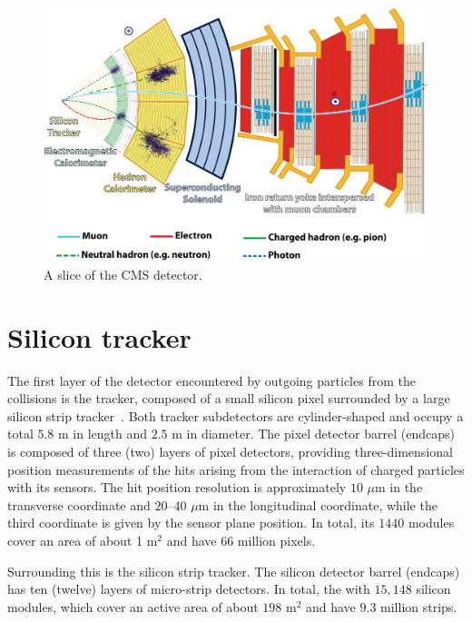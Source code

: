 \begin{figure}\centering
\includegraphics[width=.9\textwidth]{figs/cms/CMSslice_whiteBackground.png}
\caption{A slice of the CMS detector.\label{fig:CMSslice}}
\end{figure}


\section{Silicon tracker}
\label{sec:tracker}
The first layer of the detector encountered by outgoing particles from the
collisions is the tracker, composed of a small silicon pixel
surrounded by a large silicon strip tracker~\cite{Chatrchyan:2014fea}. Both tracker subdetectors are
cylinder-shaped and occupy a total $5.8$ \unit{m} in length and $2.5$
\unit{m} in diameter. The pixel detector barrel (endcaps) is composed of three (two) layers of pixel
detectors, providing three-dimensional position measurements of the
hits arising from the interaction of charged particles with its
sensors. The hit position resolution is approximately $10$ $\mu$m in
the transverse coordinate and $20–40$ $\mu$m in the longitudinal
coordinate, while the third coordinate is given by the sensor plane
position. In total, its $1440$ modules cover an area of about 1
m$^{2}$ and have $66$ million pixels.


Surrounding this is the silicon strip tracker. The silicon detector
barrel (endcaps) has ten (twelve) layers of micro-strip detectors. In
total, the with
$15,148$ silicon modules, which cover an active area of about $198$
m$^2$ and have $9.3$ million strips. 

